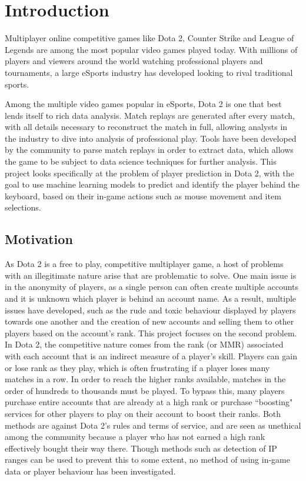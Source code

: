 \documentclass[Report.tex]{subfiles}
\begin{document}
\section{Introduction}
Multiplayer online competitive games like Dota 2, Counter Strike and League of Legends are among the most popular video games played today. With millions of players and viewers around the world watching professional players and tournaments, a large eSports industry has developed looking to rival traditional sports. 

Among the multiple video games popular in eSports, Dota 2 is one that best lends itself to rich data analysis. Match replays are generated after every match, with all details necessary to reconstruct the match in full, allowing analysts in the industry to dive into analysis of professional play. Tools have been developed by the community to parse match replays in order to extract data, which allows the game to be subject to data science techniques for further analysis. This project looks specifically at the problem of player prediction in Dota 2, with the goal to use machine learning models to predict and identify the player behind the keyboard, based on their in-game actions such as mouse movement and item selections. 

\subsection{Motivation}
As Dota 2 is a free to play, competitive multiplayer game, a host of problems with an illegitimate nature arise that are problematic to solve. One main issue is in the anonymity of players, as a single person can often create multiple accounts and it is unknown which player is behind an account name. As a result, multiple issues have developed, such as the rude and toxic behaviour displayed by players towards one another \cite{toxic} and the creation of new accounts and selling them to other players based on the account's rank. This project focuses on the second problem. In Dota 2, the competitive nature comes from the rank (or MMR) associated with each account that is an indirect measure of a player's skill. Players can gain or lose rank as they play, which is often frustrating if a player loses many matches in a row. In order to reach the higher ranks available, matches in the order of hundreds to thousands must be played. To bypass this, many players purchase entire accounts that are already at a high rank or purchase ``boosting" services for other players to play on their account to boost their ranks. Both methods are against Dota 2's rules and terms of service, and are seen as unethical among the community because a player who has not earned a high rank effectively bought their way there. Though methods such as detection of IP ranges can be used to prevent this to some extent, no method of using in-game data or player behaviour has been investigated. 
\end{document}
